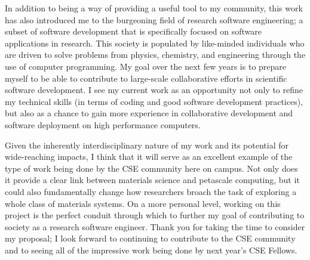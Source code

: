 \documentclass[11pt]{article}
\begin{document}
In addition to being a way of providing a useful tool to my community, this work has also introduced me to the burgeoning field of research software engineering; a subset of software development that is specifically focused on software applications in research. This society is populated by like-minded individuals who are driven to solve problems from physics, chemistry, and engineering through the use of computer programming. My goal over the next few years is to prepare myself to be able to contribute to large-scale collaborative efforts in scientific software development. I see my current work as an opportunity not only to refine my technical skills (in terms of coding and good software development practices), but also as a chance to gain more experience in collaborative development and software deployment on high performance computers.

Given the inherently interdisciplinary nature of my work and its potential for wide-reaching impacts, I think that it will serve as an excellent example of the type of work being done by the CSE community here on campus. Not only does it provide a clear link between materials science and petascale computing, but it could also fundamentally change how researchers broach the task of exploring a whole class of materials systems. On a more personal level, working on this project is the perfect conduit through which to further my goal of contributing to society as a research software engineer. Thank you for taking the time to consider my proposal; I look forward to continuing to contribute to the CSE community and to seeing all of the impressive work being done by next year's CSE Fellows.



\end{document}
